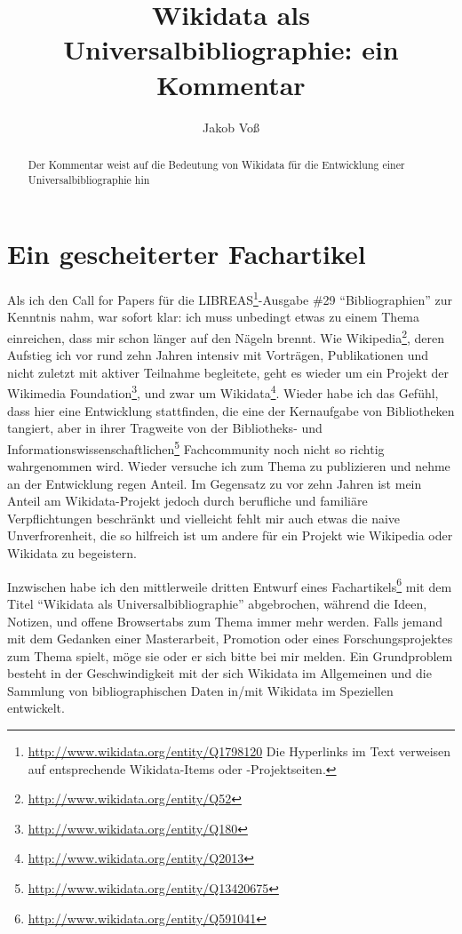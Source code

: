\documentclass[a4paper,
fontsize=11pt,
oneside,
numbers=noperiodatend,
parskip=half-,
bibliography=totoc,
final
]{scrartcl}
\title{\LARGE{Wikidata als Universalbibliographie: ein Kommentar}} %
\author{Jakob Voß} %
\date{}
\begin{document}
\maketitle
\thispagestyle{fancyplain} 

\begin{abstract}
Der Kommentar weist auf die Bedeutung von Wikidata für die Entwicklung
einer Universalbibliographie hin
\end{abstract}

\section*{Ein gescheiterter
Fachartikel}\label{ein-gescheiterter-fachartikel}

Als ich den Call for Papers für die LIBREAS\footnote{\url{http://www.wikidata.org/entity/Q1798120}
  Die Hyperlinks im Text verweisen auf entsprechende Wikidata-Items oder
  -Projektseiten.}-Ausgabe \#29 \enquote{Bibliographien} zur Kenntnis
nahm, war sofort klar: ich muss unbedingt etwas zu einem Thema
einreichen, dass mir schon länger auf den Nägeln brennt. Wie
Wikipedia\footnote{\url{http://www.wikidata.org/entity/Q52}}, deren
Aufstieg ich vor rund zehn Jahren intensiv mit Vorträgen, Publikationen
und nicht zuletzt mit aktiver Teilnahme begleitete, geht es wieder um
ein Projekt der Wikimedia Foundation\footnote{\url{http://www.wikidata.org/entity/Q180}},
und zwar um Wikidata\footnote{\url{http://www.wikidata.org/entity/Q2013}}.
Wieder habe ich das Gefühl, dass hier eine Entwicklung stattfinden, die
eine der Kernaufgabe von Bibliotheken tangiert, aber in ihrer Tragweite
von der Bibliotheks- und Informationswissenschaftlichen\footnote{\url{http://www.wikidata.org/entity/Q13420675}}
Fachcommunity noch nicht so richtig wahrgenommen wird. Wieder versuche
ich zum Thema zu publizieren und nehme an der Entwicklung regen Anteil.
Im Gegensatz zu vor zehn Jahren ist mein Anteil am Wikidata-Projekt
jedoch durch berufliche und familiäre Verpflichtungen beschränkt und
vielleicht fehlt mir auch etwas die naive Unverfrorenheit, die so
hilfreich ist um andere für ein Projekt wie Wikipedia oder Wikidata zu
begeistern.

Inzwischen habe ich den mittlerweile dritten Entwurf eines
Fachartikels\footnote{\url{http://www.wikidata.org/entity/Q591041}} mit
dem Titel \enquote{Wikidata als Universalbibliographie} abgebrochen,
während die Ideen, Notizen, und offene Browsertabs zum Thema immer mehr
werden. Falls jemand mit dem Gedanken einer Masterarbeit, Promotion oder
eines Forschungsprojektes zum Thema spielt, möge sie oder er sich bitte
bei mir melden. Ein Grundproblem besteht in der Geschwindigkeit mit der
sich Wikidata im Allgemeinen und die Sammlung von bibliographischen
Daten in/mit Wikidata im Speziellen entwickelt.
\end{document}
